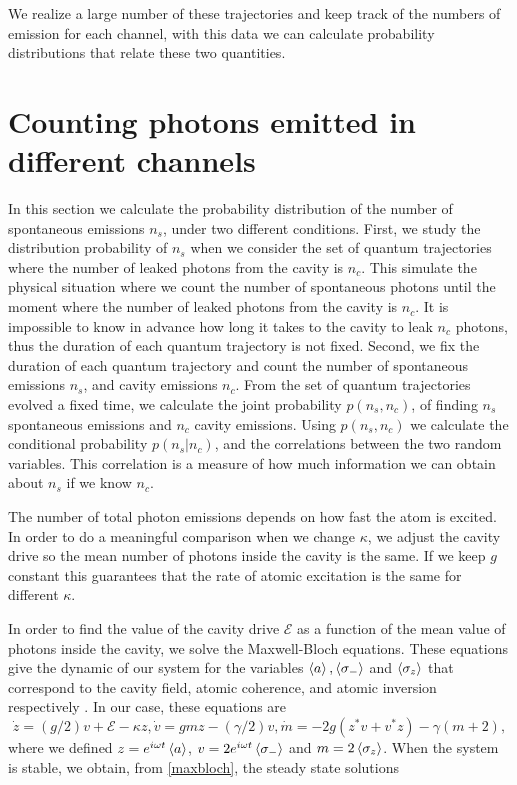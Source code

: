 \documentclass[%
 reprint,
 amsmath,amssymb,
 aps, 
]{revtex4-1}
\begin{document}
We realize a large number of these trajectories and keep track of the
numbers of emission for each channel, with this data we can calculate
probability distributions that relate these two quantities.

\section{Counting photons emitted in different channels}\label{sc:distributions}
In this section we calculate the probability distribution of the
number of spontaneous emissions $n_s$, under two different conditions.
First, we study the distribution probability of $n_s$ when we consider
the set of quantum trajectories where the number of leaked photons
from the cavity is $n_c$. This simulate the physical situation where
we count the number of spontaneous photons until the moment where the
number of leaked photons from the cavity is $n_c$. It is impossible to
know in advance how long it takes to the cavity to leak $n_c$ photons,
thus the duration of each quantum trajectory is not fixed. Second, we
fix the duration of each quantum trajectory and count the number of
spontaneous emissions $n_s$, and cavity emissions $n_c$. From the set
of quantum trajectories evolved a fixed time, we calculate the joint
probability $p(n_s,n_c)$, of finding $n_s$ spontaneous emissions and
$n_c$ cavity emissions. Using $p(n_s,n_c)$ we calculate the
conditional probability $p(n_s|n_c)$, and the correlations between the
two random variables. This correlation is a measure of how much
information we can obtain about $n_s$ if we know $n_c$.

The number of total photon emissions depends on how fast the atom is
excited. In order to do a meaningful comparison when we change
$\kappa$, we adjust the cavity drive so the mean number of photons
inside the cavity is the same. If we keep $g$ constant this guarantees
that the rate of atomic excitation is the same for different $\kappa$.

In order to find the value of the cavity drive $\mathcal{E}$ as a
function of the mean value of photons inside the cavity, we solve the
Maxwell-Bloch equations. These equations give the dynamic of our
system for the variables $\expval{a}, \expval{\sigma_-}$ and
$\expval{\sigma_z}$ that correspond to the cavity field, atomic
coherence, and atomic inversion respectively \cite{Alsing_1991}. In
our case, these equations are
\begin{subequations} \label{maxbloch}
\begin{equation} \label{bloch1}
\dot{z} = (g/2)v + \mathcal{E} - \kappa z,
\end{equation}
\begin{equation} \label{bloch2}
\dot{v} = gmz - (\gamma/2)v,
\end{equation}
\begin{equation} \label{bloch3}
\dot{m} = -2g(z^*v + v^*z) - \gamma(m + 2),
\end{equation}
\end{subequations} 
where we defined $z = e^{i\omega t}\expval{a}$,
$v = 2e^{i\omega t}\expval{\sigma_-}$ and $m = 2\expval{\sigma_z}$.
When the system is stable, we obtain, from
\eqref{maxbloch}, the steady state
solutions \cite{gagniuc2017markov}
\end{document}
